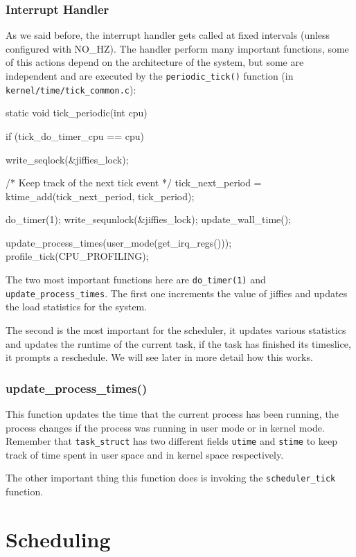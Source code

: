 \documentclass[10pt, oneside]{book}
\begin{document}
\subsubsection{Interrupt Handler}

As we said before, the interrupt handler gets called at fixed intervals (unless configured with NO\_HZ). The handler perform many important functions, some of this actions depend on the architecture of the system, but some are independent and are executed by the \verb|periodic_tick()| function (in \verb|kernel/time/tick_common.c|):

\begin{code}
static void tick_periodic(int cpu)
{
  if (tick_do_timer_cpu == cpu) {
    write_seqlock(&jiffies_lock);

    /* Keep track of the next tick event */
    tick_next_period = ktime_add(tick_next_period, tick_period);

    do_timer(1);
    write_sequnlock(&jiffies_lock);
    update_wall_time();
  }

  update_process_times(user_mode(get_irq_regs()));
  profile_tick(CPU_PROFILING);
}
\end{code}
The two most important functions here are \verb|do_timer(1)| and \verb|update_process_times|. The first one increments the value of jiffies and updates the load statistics for the system.

The second is the most important for the scheduler, it updates various statistics and updates the runtime of the current task, if the task has finished its timeslice, it prompts a reschedule. We will see later in more detail how this works.

\subsubsection{update\_process\_times()}
This function updates the time that the current process has been running, the process changes if the process was running in user mode or in kernel mode. Remember that \verb|task_struct| has two different fields \verb|utime| and \verb|stime| to keep track of time spent in user space and in kernel space respectively.

The other important thing this function does is invoking the \verb|scheduler_tick| function.

\section{Scheduling}
\end{document}
